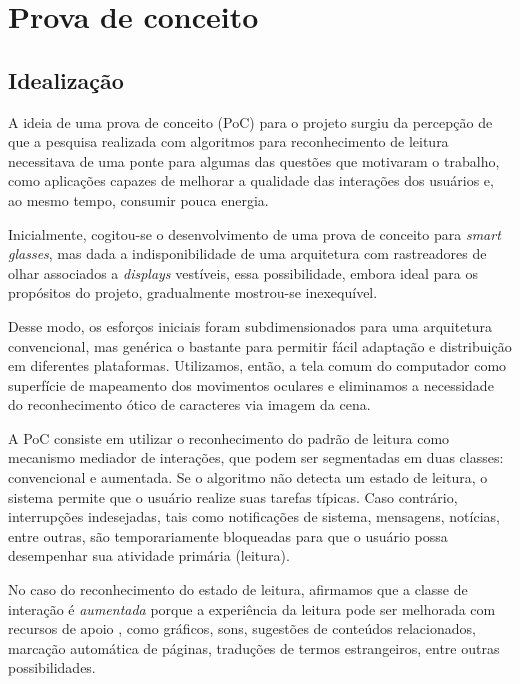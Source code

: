 \documentclass[12pt]{article}
\begin{document}
		    
		
		
		\clearpage
	\section{Prova de conceito}
	
		\subsection{Idealização}
		A ideia de uma prova de conceito (PoC) para o projeto surgiu da percepção de que a pesquisa realizada com algoritmos para reconhecimento de leitura necessitava de uma ponte para algumas das questões que motivaram o trabalho, como aplicações capazes de melhorar a qualidade das interações dos usuários e, ao mesmo tempo, consumir pouca energia.
		
		Inicialmente, cogitou-se o desenvolvimento de uma prova de conceito para \textit{smart glasses}, mas dada a indisponibilidade de uma arquitetura com rastreadores de olhar associados a \textit{displays} vestíveis, essa possibilidade, embora ideal para os propósitos do projeto, gradualmente mostrou-se inexequível.
		
		Desse modo, os esforços iniciais foram subdimensionados para uma arquitetura convencional, mas genérica o bastante para permitir fácil adaptação e distribuição em diferentes plataformas. Utilizamos, então, a tela comum do computador como superfície de mapeamento dos movimentos oculares e eliminamos a necessidade do reconhecimento ótico de caracteres via imagem da cena.
		
		A PoC consiste em utilizar o reconhecimento do padrão de leitura como mecanismo mediador de interações, que podem ser segmentadas em duas classes: convencional e aumentada. Se o algoritmo não detecta um estado de leitura, o sistema permite que o usuário realize suas tarefas típicas. Caso contrário, interrupções indesejadas, tais como notificações de sistema, mensagens, notícias, entre outras, são temporariamente bloqueadas para que o usuário possa desempenhar sua atividade primária (leitura). 
		
		No caso do reconhecimento do estado de leitura, afirmamos que a classe de interação é \textit{aumentada} porque a experiência da leitura pode ser melhorada com recursos de apoio \cite{Biedert-2010}, como gráficos, sons, sugestões de conteúdos relacionados, marcação automática de páginas, traduções de termos estrangeiros, entre outras possibilidades.		
		
\end{document}

